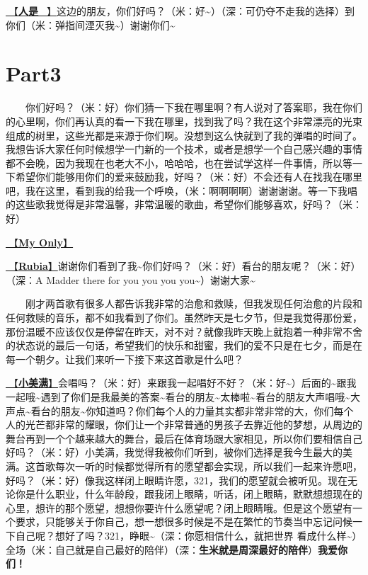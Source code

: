 \documentclass[]{ctexbook}
\begin{document}
\hyperref[renshi]{🎵【\textbf{人是\_}】}这边的朋友，你们好吗？（米：好\textasciitilde）（深：可仍夺不走我的选择）到你们（米：弹指间湮灭我\textasciitilde）谢谢你们\textasciitilde{}

\section{Part3}\label{nanjing-20240811-part3}

  你们好吗？（米：好）你们猜一下我在哪里啊？有人说对了答案耶，我在你们的心里啊，你们再认真的看一下我在哪里，找到我了吗？我在这个非常漂亮的光束组成的树里，这些光都是来源于你们啊。没想到这么快就到了我的弹唱的时间了。我想告诉大家任何时候想学一门新的一个技术，或者是想学一个自己感兴趣的事情都不会晚，因为我现在也老大不小，哈哈哈，也在尝试学这样一件事情，所以等一下希望你们能够用你们的爱来鼓励我，好吗？（米：好）不会还有人在找我在哪里吧，我在这里，看到我的给我一个呼唤，（米：啊啊啊啊）谢谢谢谢。等一下我唱的这些歌我觉得是非常温馨，非常温暖的歌曲，希望你们能够喜欢，好吗？（米：好）

\hyperref[my-only]{🎵【\textbf{My Only}】}

\hyperref[rubia]{🎵【\textbf{Rubia}】}谢谢你们看到了我\textasciitilde 你们好吗？（米：好）看台的朋友呢？（米：好）（深：A Madder there for you you you you\textasciitilde）谢谢大家\textasciitilde{}

  刚才两首歌有很多人都告诉我非常的治愈和救赎，但我发现任何治愈的片段和任何救赎的音乐，都不如我看到了你们。虽然昨天是七夕节，但是我觉得那份爱，那份温暖不应该仅仅是停留在昨天，对不对？就像我昨天晚上就抱着一种非常不舍的状态说的最后一句话，希望我们的快乐和甜蜜，我们的爱不只是在七夕，而是在每一个朝夕。让我们来听一下接下来这首歌是什么吧？

\hyperref[happy-ending]{🎵【\textbf{小美满}】}会唱吗？（米：好）来跟我一起唱好不好？（米：好\textasciitilde）后面的\textasciitilde 跟我一起哦\textasciitilde 遇到了你们是我最美的答案\textasciitilde 看台的朋友\textasciitilde 太棒啦\textasciitilde 看台的朋友大声唱哦\textasciitilde 大声点\textasciitilde 看台的朋友\textasciitilde 你知道吗？你们每个人的力量其实都非常非常的大，你们每个人的光芒都非常的耀眼，你们让一个非常普通的男孩子去靠近他的梦想，从周边的舞台再到一个个越来越大的舞台，最后在体育场跟大家相见，所以你们要相信自己好吗？（米：好）小美满，我觉得我被你们听到，被你们选择是我今生最大的美满。这首歌每次一听的时候都觉得所有的愿望都会实现，所以我们一起来许愿吧，好吗？（米：好）像我这样闭上眼睛许愿，321，我们的愿望就会被听见。现在无论你是什么职业，什么年龄段，跟我闭上眼睛，听话，闭上眼睛，默默想想现在的心里，想许的那个愿望，想想你要许什么愿望呢？闭上眼睛哦。但是这个愿望有一个要求，只能够关于你自己，想一想很多时候是不是在繁忙的节奏当中忘记问候一下自己呢？想好了吗？321，睁眼\textasciitilde（深：你愿相信什么，就把世界 看成什么样\textasciitilde）全场（米：自己就是自己最好的陪伴）（深：\textbf{生米就是周深最好的陪伴}）\textbf{我爱你们！}
\end{document}
